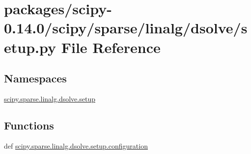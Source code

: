 \hypertarget{packages_2scipy-0_814_80_2scipy_2sparse_2linalg_2dsolve_2setup_8py}{}\section{packages/scipy-\/0.14.0/scipy/sparse/linalg/dsolve/setup.py File Reference}
\label{packages_2scipy-0_814_80_2scipy_2sparse_2linalg_2dsolve_2setup_8py}
\subsection*{Namespaces}
\begin{DoxyCompactItemize}
\item 
 \hyperlink{namespacescipy_1_1sparse_1_1linalg_1_1dsolve_1_1setup}{scipy.\+sparse.\+linalg.\+dsolve.\+setup}
\end{DoxyCompactItemize}
\subsection*{Functions}
\begin{DoxyCompactItemize}
\item 
def \hyperlink{namespacescipy_1_1sparse_1_1linalg_1_1dsolve_1_1setup_a4a956557969281ff6cbd68585644b821}{scipy.\+sparse.\+linalg.\+dsolve.\+setup.\+configuration}
\end{DoxyCompactItemize}
